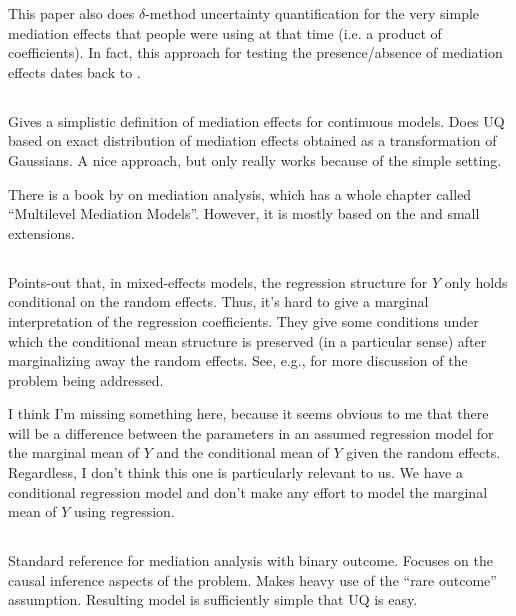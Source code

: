 \documentclass{report}
\begin{document}
This paper also does $\delta$-method uncertainty quantification for the very simple mediation effects that people were using at that time (i.e. a product of coefficients). In fact, this approach for testing the presence/absence of mediation effects dates back to \citet{Sob82}.

\subsection{\citet{Ken03}}

Gives a simplistic definition of mediation effects for continuous models. Does UQ based on exact distribution of mediation effects obtained as a transformation of Gaussians. A nice approach, but only really works because of the simple setting.

There is a book by \citet{Mac17} on mediation analysis, which has a whole chapter called ``Multilevel Mediation Models''. However, it is mostly based on the \citet{Ken03} and small extensions. 

\subsection{\citet{Rit04}}

Points-out that, in mixed-effects models, the regression structure for $Y$ only holds conditional on the random effects. Thus, it's hard to give a marginal interpretation of the regression coefficients. They give some conditions under which the conditional mean structure is preserved (in a particular sense) after marginalizing away the random effects. See, e.g., \citet{Neu91} for more discussion of the problem being addressed.

I think I'm missing something here, because it seems obvious to me that there will be a difference between the parameters in an assumed regression model for the marginal mean of $Y$ and the conditional mean of $Y$ given the random effects. Regardless, I don't think this one is particularly relevant to us. We have a conditional regression model and don't make any effort to model the marginal mean of $Y$ using regression.


\subsection{\citet{Van10}}

Standard reference for mediation analysis with binary outcome. Focuses on the causal inference aspects of the problem. Makes heavy use of the ``rare outcome'' assumption. Resulting model is sufficiently simple that UQ is easy.
\end{document}
